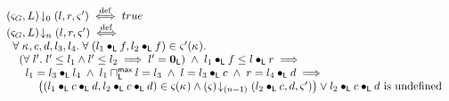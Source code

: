 \begin{definition}
\[\begin{array}{l}
	
	\extendsAMUpto{\amod{G}, L}{0}{l}{r}{\amod{}'} \iffdef true \\ 
	
	\extendsAMUpto{\amod{G}, L}{n}{l}{r}{\amod{}'} \iffdef \\ 

	\hspace*{0.2cm}\for{\ca{}, c, d, l_3, l_4}\for{(l_1 \composeL f, l_2 \composeL f) \in \amod{}'(\ca{})} \\
	\hspace*{0.4cm}\left(\for{l'} l' \leq l_1 \land l' \leq l_2 \implies l' = \unitL\right) \;\land\; l_1 \composeL f \leq  l \composeL r \implies\\
	\hspace*{0.6cm} l_1 = l_3 \composeL l_4 \;\land\; l_1 \maxMeetL l = l_3 \;\land\; l = l_3 \composeL c \;\land\; r = l_4 \composeL d\implies\\
	\hspace*{1cm} \left((l_1 \composeL c \composeL d, l_2 \composeL c \composeL d) \in \amod{}(\ca{}) \land
	\extendsAMUpto{\amod{}}{(n-1)}{l_2 \composeL c}{d}{\amod{}'}\right) \lor l_2 \composeL c \composeL d \text{ is undefined}\\\\
	
%	
%	
	

\end{array}\]
\end{definition}
